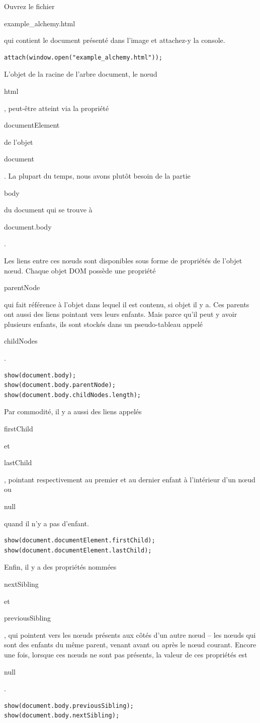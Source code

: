 \documentclass{FramateX}
\renewcommand{\texttt}[1]{\begin{sffamily}{#1}\end{sffamily}}
\begin{document}
Ouvrez le fichier \texttt{example\_alchemy.html} qui contient le
document présenté dans l'image et attachez-y la console.

\begin{lstlisting}
attach(window.open("example_alchemy.html"));
\end{lstlisting}
L'objet de la racine de l'arbre document, le nœud \texttt{html},
peut-être atteint via la propriété \texttt{documentElement} de l'objet
\texttt{document}. La plupart du temps, nous avons plutôt besoin de la
partie \texttt{body} du document qui se trouve à \texttt{document.body}.

\begin{center}\end{center}

Les liens entre ces nœuds sont disponibles sous forme de propriétés de
l'objet nœud. Chaque objet DOM possède une propriété \texttt{parentNode}
qui fait référence à l'objet dans lequel il est contenu, si objet il y
a. Ces parents ont aussi des liens pointant vers leurs enfants. Mais
parce qu'il peut y avoir plusieurs enfants, ils sont stockés dans un
pseudo-tableau appelé \texttt{childNodes}.

\begin{lstlisting}
show(document.body);
show(document.body.parentNode);
show(document.body.childNodes.length);
\end{lstlisting}
Par commodité, il y a aussi des liens appelés \texttt{firstChild} et
\texttt{lastChild}, pointant respectivement au premier et au dernier
enfant à l'intérieur d'un nœud ou \texttt{null} quand il n'y a pas
d'enfant.

\begin{lstlisting}
show(document.documentElement.firstChild);
show(document.documentElement.lastChild);
\end{lstlisting}
Enfin, il y a des propriétés nommées \texttt{nextSibling} et
\texttt{previousSibling}, qui pointent vers les nœuds présents aux côtés
d'un autre nœud -- les nœuds qui sont des enfants du même parent, venant
avant ou après le nœud courant. Encore une fois, lorsque ces nœuds ne
sont pas présents, la valeur de ces propriétés est \texttt{null}.

\begin{lstlisting}
show(document.body.previousSibling);
show(document.body.nextSibling);
\end{lstlisting}
\begin{center}\end{center}
\end{document}
